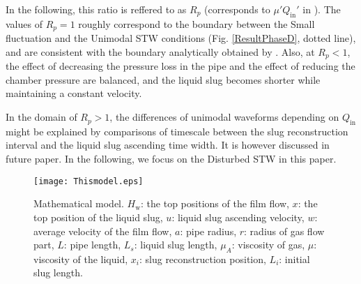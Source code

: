 \documentclass[aps,pre,preprint,groupedaddress,showkeys]{revtex4-2}
\begin{document}
In the following, this ratio is reffered to as $ R_p $ (corresponds to $ \mu' Q_ \mathrm{in} '$ in \cite{kanno2018}).
The values of $ R_p = 1 $ roughly correspond to the boundary between the Small fluctuation and the Unimodal STW conditions (Fig. \ref{ResultPhaseD}, dotted line), and are consistent with the boundary analytically obtained by \cite {kanno2018}.
Also, at $ R_p <1 $, the effect of decreasing the pressure loss in the pipe and the effect of reducing the chamber pressure are balanced, and the liquid slug becomes shorter while maintaining a constant velocity.

In the domain of $ R_p> 1 $, the differences of unimodal waveforms depending on $Q_ \mathrm{in}$ might be explained by comparisons of timescale between the slug reconstruction interval and the liquid slug ascending time width. It is however discussed in future paper.
In the following, we focus on the Disturbed STW in this paper.

\begin{figure}
\texttt{[image: Thismodel.eps]} 
\caption{\label{Thismodel}Mathematical model. $H_\mathrm{w}$: the top positions of the film flow, $x$: the top position of the liquid slug, $u$: liquid slug ascending velocity, $w$: average velocity of the film flow, $a$: pipe radius, $r$: radius of gas flow part, $L$: pipe length, $L_s$: liquid slug length, $\mu_A$: viscosity of gas, $\mu$: viscosity of the liquid, $x_i$: slug reconstruction position, $L_i$: initial slug length.}
\end{figure}
\end{document}
